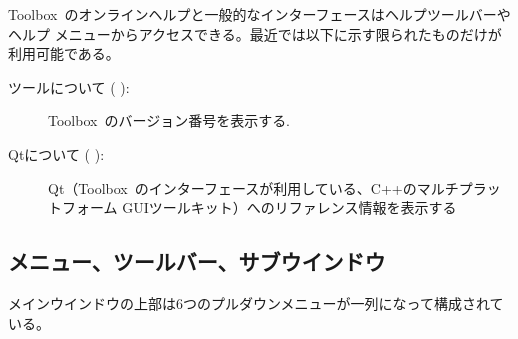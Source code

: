\documentclass[\pformat,12pt]{jarticle}
\newcommand{\Toolbox}{Toolbox}
\newcommand{\guicmd}[1]{{\gt #1}}
\begin{document}



\Toolbox\ のオンラインヘルプと一般的なインターフェースは\guicmd{ヘルプ}ツールバーや\guicmd{ヘルプ}
メニューからアクセスできる。最近では以下に示す限られたものだけが利用可能である。

\begin{description}
 \item[\guicmd{ツールについて} (\hspace{-1.8mm}
):]
  \Toolbox\ のバージョン番号を表示する.
 \item[\guicmd{Qtについて}  (\hspace{-1.8mm}
):]
  Qt（\Toolbox\ のインターフェースが利用している、C++のマルチプラットフォーム
  GUIツールキット）へのリファレンス情報を表示する
\end{description}

\subsection{メニュー、ツールバー、サブウインドウ}

メインウインドウの上部は6つのプルダウンメニューが一列になって構成されている。
\end{document}
